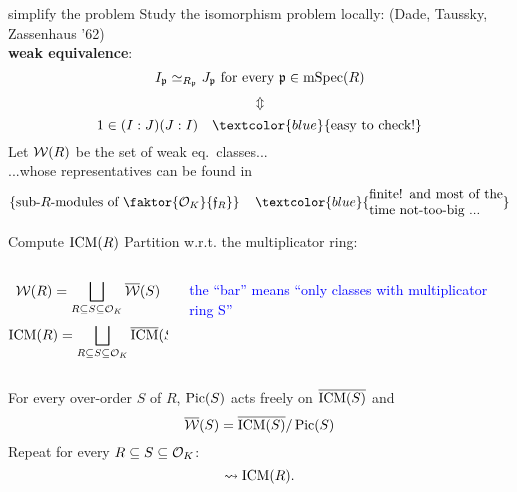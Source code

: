 \documentclass{beamer}
\begin{document}
\begin{frame}{ simplify the problem  }
   Study the isomorphism problem locally: (Dade, Taussky, Zassenhaus '62)\\
\pause  \textbf{weak equivalence}:
\[I_{\mathfrak p}\simeq_{R_{\mathfrak p}} J_{\mathfrak p} \text{ for every }{\mathfrak p}\in \operatorname{mSpec}(R)\]
\pause \vspace{-6mm}\[\Updownarrow\]
\[1\in (I:J)(J:I)\quad \textcolor{blue}{\text{easy to check!}}\]
\pause Let ${\mathcal W}(R)$ be the set of weak eq.~classes...\\
\pause ...whose representatives can be found in
	\[\set{\text{sub-$R$-modules of $\faktor{\cO_K}{\frf_R}$}}\quad \textcolor{blue}{\parbox{10 em}{finite! and most of the time not-too-big ...}}\]
\end{frame}

\begin{frame}{ Compute $\operatorname{ICM}(R)$ }
\pause Partition w.r.t. the multiplicator ring:
    \begin{columns}
    \begin{column}{0.5\textwidth}
      \[ {\mathcal W}(R) = \bigsqcup_{R\subseteq S \subseteq {\mathcal O}_K} \overline {{\mathcal W}}(S)\]
      \[\operatorname{ICM}(R) = \bigsqcup_{R\subseteq S \subseteq {\mathcal O}_K} \overline {\operatorname{ICM}}(S)\]
    \end{column}
\pause
    \begin{column}{0.5\textwidth}  %
	\begin{center}
	\textcolor{blue}{\parbox{10em}{the ``bar'' means ``only classes with multiplicator ring S''}} 
	\end{center}
    \end{column}
    \end{columns}
\pause
   \begin{theorem}
    For every over-order $S$ of $R$, $\operatorname{Pic}(S)$ acts freely on $\overline{\operatorname{ICM}(S)}$ and
    \[ \overline{{\mathcal W}}(S) = \overline{\operatorname{ICM}(S)}/\operatorname{Pic}(S) \]
\pause Repeat for every $R\subseteq S \subseteq {\mathcal O}_K$:
    \[ \rightsquigarrow \operatorname{ICM}(R).\]
   \end{theorem}
\end{frame}   
\end{document}
